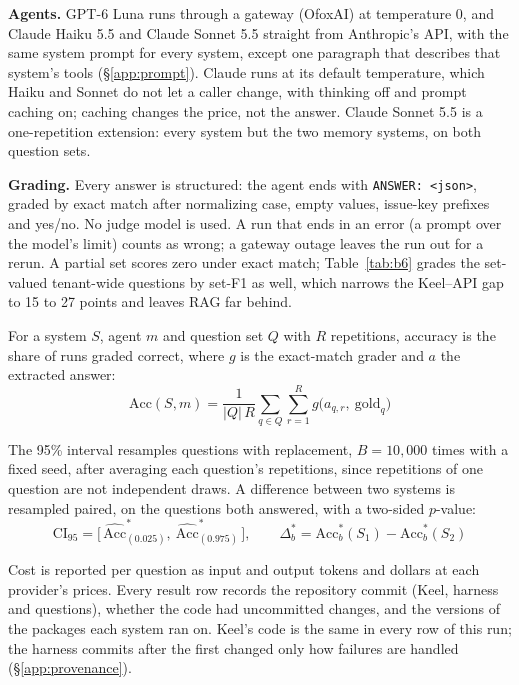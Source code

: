 \documentclass[sigconf, nonacm]{acmart}
\newcommand{\code}[1]{\texttt{#1}}
\begin{document}
\textbf{Agents.} GPT-6 Luna runs through a gateway (OfoxAI) at temperature 0, and Claude Haiku 5.5 and Claude Sonnet 5.5 straight from Anthropic's API, with the same system prompt for every system, except one paragraph that describes that system's tools (\S\ref{app:prompt}). Claude runs at its default temperature, which Haiku and Sonnet do not let a caller change, with thinking off and prompt caching on; caching changes the price, not the answer. Claude Sonnet 5.5 is a one-repetition extension: every system but the two memory systems, on both question sets.

\textbf{Grading.} Every answer is structured: the agent ends with \code{ANSWER: <json>}, graded by exact match after normalizing case, empty values, issue-key prefixes and yes/no. No judge model is used. A run that ends in an error (a prompt over the model's limit) counts as wrong; a gateway outage leaves the run out for a rerun. A partial set scores zero under exact match; Table~\ref{tab:b6} grades the set-valued tenant-wide questions by set-F1 as well, which narrows the Keel--API gap to 15 to 27 points and leaves RAG far behind.

For a system $S$, agent $m$ and question set $Q$ with $R$ repetitions, accuracy is the share of runs graded correct, where $g$ is the exact-match grader and $a$ the extracted answer:
\begin{equation*}
\mathrm{Acc}(S, m) = \frac{1}{|Q|\,R} \sum_{q \in Q} \sum_{r=1}^{R} g\big(a_{q,r},\ \mathrm{gold}_q\big)
\end{equation*}

The 95\% interval resamples questions with replacement, $B = 10{,}000$ times with a fixed seed, after averaging each question's repetitions, since repetitions of one question are not independent draws. A difference between two systems is resampled paired, on the questions both answered, with a two-sided $p$-value:
\begin{equation*}
\mathrm{CI}_{95} = \big[\,\widehat{\mathrm{Acc}}^{*}_{(0.025)},\ \widehat{\mathrm{Acc}}^{*}_{(0.975)}\,\big], \qquad \Delta^{*}_b = \mathrm{Acc}^{*}_b(S_1) - \mathrm{Acc}^{*}_b(S_2)
\end{equation*}

Cost is reported per question as input and output tokens and dollars at each provider's prices. Every result row records the repository commit (Keel, harness and questions), whether the code had uncommitted changes, and the versions of the packages each system ran on. Keel's code is the same in every row of this run; the harness commits after the first changed only how failures are handled (\S\ref{app:provenance}).
\end{document}
